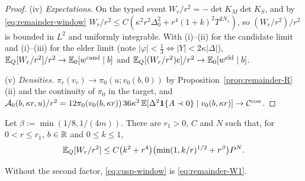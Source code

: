 \begin{proof}
(iv) \emph{Expectations.} On the typed event $W_r/r^2=-\det K_M\det K_S$, and by \eqref{eq:remainder-window} $W_r/r^2\le C(\kappa^2r^2\Delta_0^2+r^4(1+k)^2T^{2N_1})$, so $(W_r/r^2)/r^2$ is bounded in $L^2$ and uniformly integrable. With (i)--(ii) for the candidate limit and (i)--(iii) for the elder limit (note $|\varphi|<\frac13\iff|Y|<2\kappa|\Delta|$), $\mathbb E_Q[W_r/r^2]/r^2\to\mathbb E_0[w^{\mathrm{cand}}\mid b]$ and $\mathbb E_Q[(W_r/r^2)e]/r^2\to\mathbb E_0[w^{\mathrm{eld}}\mid b]$.

(v) \emph{Densities.} $\pi_r(v_r)\to\pi_0(u;v_0(b,0))$ by Proposition~\ref{prop:remainder-R}(ii) and the continuity of $\pi_0$ in the target, and $\mathcal A_0(b,\kappa r,u)/r^2=12\pi_0(v_0(b,\kappa r))\,36\kappa^2\,\mathbb E[\Delta^2\mathbf 1\{A\prec0\}\mid v_0(b,\kappa r)]\to\mathcal C^{\mathrm{con}}$.
\end{proof}

\begin{lemma}\label{lem:cusp-window}
Let $\beta:=\min(1/8,1/(4m))$. There are $r_1>0$, $C$ and $N$ such that, for $0<r\le r_1$, $b\in\mathbb R$ and $0\le k\le1$,
\begin{equation}\label{eq:cusp-window}
\mathbb E_Q[W_r/r^2]\le C\bigl(k^2+r^4\bigr)\bigl(\min(1,k/r)^{1/2}+r^\beta\bigr)P^N .
\end{equation}
\end{lemma}

Without the second factor, \eqref{eq:cusp-window} is \eqref{eq:remainder-W1}.

